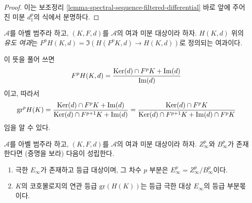 \begin{proof}
이는 보조정리 \ref{lemma-spectral-sequence-filtered-differential} 바로 앞에
주어진 미분 $d_1^p$의 식에서 분명하다.
\end{proof}

\begin{definition}
\label{definition-filtration-cohomology-filtered-differential}
$\mathcal{A}$를 아벨 범주라 하고, $(K, F, d)$를 $\mathcal{A}$의 여과
미분 대상이라 하자. $H(K, d)$ 위의 {\it 유도 여과}는
$F^pH(K, d) = \Im(H(F^pK, d) \to H(K, d))$로 정의되는 여과이다.
\end{definition}

\noindent
이 뜻을 풀어 쓰면
$$
F^pH(K, d) =
\frac{\mathop{\mathrm{Ker}}(d) \cap F^pK + \mathop{\mathrm{Im}}(d)}{\mathop{\mathrm{Im}}(d)}
$$
이고, 따라서
$$
\text{gr}^p H(K) =
\frac{\mathop{\mathrm{Ker}}(d) \cap F^pK + \mathop{\mathrm{Im}}(d)}{\mathop{\mathrm{Ker}}(d) \cap F^{p + 1}K + \mathop{\mathrm{Im}}(d)} =
\frac{\mathop{\mathrm{Ker}}(d) \cap F^pK}{\mathop{\mathrm{Ker}}(d) \cap F^{p + 1}K + \mathop{\mathrm{Im}}(d) \cap F^pK}
$$
임을 알 수 있다.

\begin{lemma}
\label{lemma-compute-filtered-cohomology}
$\mathcal{A}$를 아벨 범주라 하고, $(K, F, d)$를 $\mathcal{A}$의 여과
미분 대상이라 하자. $Z_\infty^p$와 $B_\infty^p$가 존재한다면
(증명을 보라) 다음이 성립한다.
\begin{enumerate}
\item 극한 $E_\infty$가 존재하고 등급 대상이며, 그 차수 $p$ 부분은
$E_\infty^p = Z_\infty^p/B_\infty^p$이다.
\item $K$의 코호몰로지의 연관 등급 $\text{gr}(H(K))$는 등급 극한 대상
$E_\infty$의 등급 부분몫이다.
\end{enumerate}
\end{lemma}

